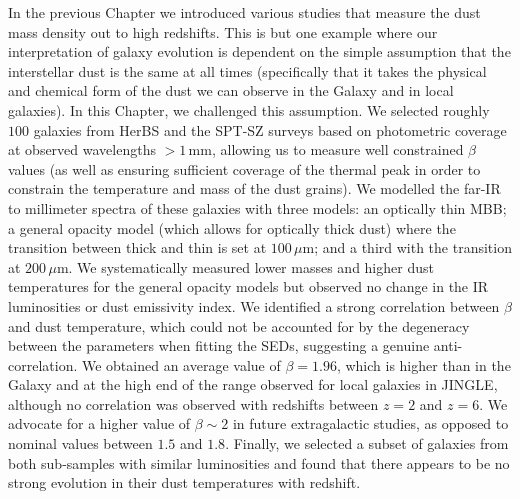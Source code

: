 In the previous Chapter we introduced various studies that measure the dust mass density out to high redshifts. This is but one example where our interpretation of galaxy evolution is dependent on the simple assumption that the interstellar dust is the same at all times (specifically that it takes the physical and chemical form of the dust we can observe in the Galaxy and in local galaxies). In this Chapter, we challenged this assumption. We selected roughly $100$ galaxies from HerBS and the SPT-SZ surveys based on photometric coverage at observed wavelengths $>1\,$mm, allowing us to measure well constrained $\beta$ values (as well as ensuring sufficient coverage of the thermal peak in order to constrain the temperature and mass of the dust grains). We modelled the far-IR to millimeter spectra of these galaxies with three models: an optically thin MBB; a general opacity model (which allows for optically thick dust) where the transition between thick and thin is set at $100\,\mu$m; and a third with the transition at $200\,\mu$m. We systematically measured lower masses and higher dust temperatures for the general opacity models but observed no change in the IR luminosities or dust emissivity index. We identified a strong correlation between $\beta$ and dust temperature, which could not be accounted for by the degeneracy between the parameters when fitting the SEDs, suggesting a genuine anti-correlation. We obtained an average value of $\beta = 1.96$, which is higher than in the Galaxy and at the high end of the range observed for local galaxies in JINGLE, although no correlation was observed with redshifts between $z = 2$ and $z = 6$. We advocate for a higher value of $\beta \sim 2$ in future extragalactic studies, as opposed to nominal values between $1.5$ and $1.8$. Finally, we selected a subset of galaxies from both sub-samples with similar luminosities and found that there appears to be no strong evolution in their dust temperatures with redshift.
